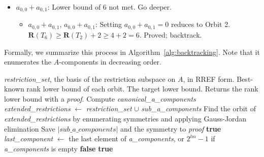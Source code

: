 \documentclass[11pt]{article}
\begin{document}
\begin{itemize}
\begin{itemize}
\begin{itemize}
                \end{itemize}
        \end{itemize}
  \item $a_{0,0}+a_{0,1}$: Lower bound of 6 not met. Go deeper.
        \begin{itemize}
          \item $a_{0,0}+a_{0,1}$, $a_{0,0}+a_{0,1}$: Setting $a_{0,0}+a_{0,1}=0$ reduces to Orbit 2. $\mathbf{R}(T_6) \ge \mathbf{R}(T_2)+2 \ge 4+2=6$. Proved; backtrack.
        \end{itemize}
\end{itemize}

Formally, we summarize this process in Algorithm~\ref{alg:backtracking}. Note that it enumerates the $A$-components in decreasing order.

\begin{algorithm}[H]
  \caption{Backtracking Algorithm}
  \label{alg:backtracking}
  \begin{algorithmic}[1]
    \Require \textit{restriction\_set}, the basis of the restriction subspace on $A$, in RREF form.
    \Require Best-known rank lower bound of each orbit.
    \Require The target lower bound.
    \Ensure Returns the rank lower bound with a \textit{proof}.
    \State Compute \textit{canonical\_a\_components}
    \State \textit{extended\_restrictions} $\gets$ \textit{restriction\_set} $\cup$ \textit{sub\_a\_components}
    \State Find the orbit of \textit{extended\_restrictions} by enumerating symmetries and applying Gauss-Jordan elimination \label{alg:find-orbit}
    \State Save $|\textit{sub\_a\_components}|$ and the symmetry to \textit{proof}
    \State \Return \textbf{true} \label{alg:find-a-proof}
    \EndIf
    \EndFor
    \EndIf
    \State \textit{last\_component} $\gets$ the last element of \textit{a\_components}, or $2^{lm}-1$ if \textit{a\_components} is empty
    \State \Return \textbf{false}
    \EndIf
    \EndFor
    \State \Return \textbf{true}
    \EndFunction
  \end{algorithmic}
\end{algorithm}
\end{document}
